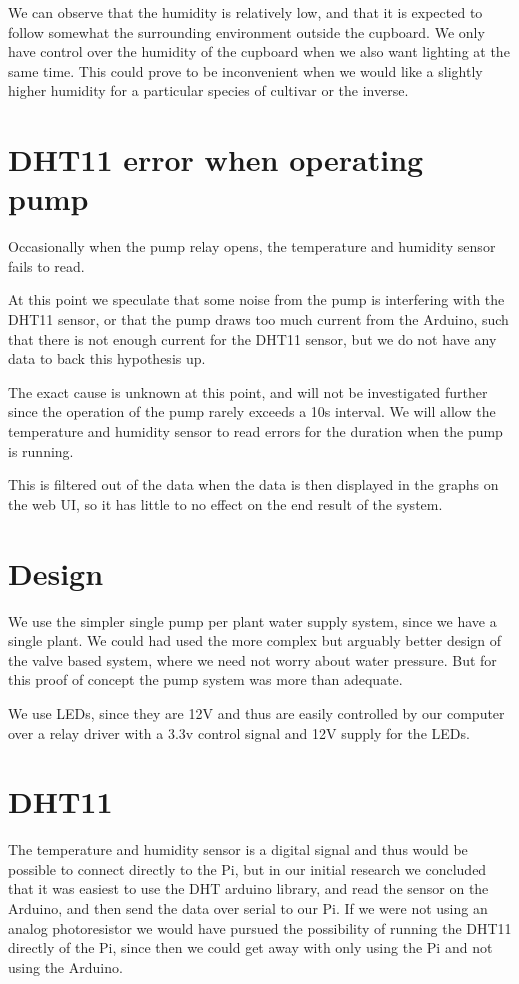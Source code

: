 \documentclass[a4paper,12pt,twoside,openright,titlepage]{book}
\begin{document}
We can observe that the humidity is relatively low, and that it is expected to follow somewhat the surrounding environment outside the cupboard.
We only have control over the humidity of the cupboard when we also want lighting at the same time. This could prove to be inconvenient when we would like a slightly higher humidity for a particular species of cultivar or the inverse.

\section{DHT11 error when operating pump}
Occasionally when the pump relay opens, the temperature and humidity sensor fails to read.

At this point we speculate that some noise from the pump is interfering with the DHT11 sensor, or that the pump draws too much current from the Arduino, such that there is not enough current for the DHT11 sensor, but we do not have any data to back this hypothesis up.

The exact cause is unknown at this point, and will not be investigated further since the operation of the pump rarely exceeds a 10s interval. We will allow the temperature and humidity sensor to read errors for the duration when the pump is running.

This is filtered out of the data when the data is then displayed in the graphs on the web UI, so it has little to no effect on the end result of the system.

\section{Design}
We use the simpler single pump per plant water supply system, since we have a single plant.
We could had used the more complex but arguably better design of the valve based system, where we need not worry about water pressure. But for this proof of concept the pump system was more than adequate.

We use LEDs, since they are 12V and thus are easily controlled by our computer over a relay driver with a 3.3v control signal and 12V supply for the LEDs.

\section{DHT11}
The temperature and humidity sensor is a digital signal and thus would be possible to connect directly to the Pi, but in our initial research we concluded that it was easiest to use the DHT arduino library, and read the sensor on the Arduino, and then send the data over serial to our Pi. If we were not using an analog photoresistor we would have pursued the possibility of running the DHT11 directly of the Pi, since then we could get away with only using the Pi and not using the Arduino.
\end{document}
